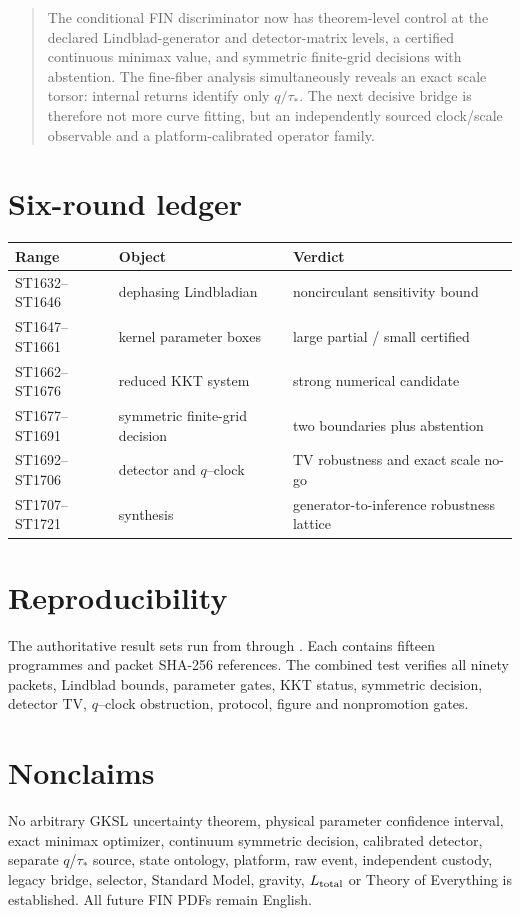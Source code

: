 \documentclass[11pt,a4paper]{article}
\begin{document}
\begin{quote}
The conditional FIN discriminator now has theorem-level control at the
declared Lindblad-generator and detector-matrix levels, a certified continuous
minimax value, and symmetric finite-grid decisions with abstention.  The
fine-fiber analysis simultaneously reveals an exact scale torsor: internal
returns identify only $q/\tau_*$.  The next decisive bridge is therefore not
more curve fitting, but an independently sourced clock/scale observable and a
platform-calibrated operator family.
\end{quote}

\appendix
\section{Six-round ledger}
\begin{longtable}{@{}p{}p{}p{}@{}}
\toprule
Range & Object & Verdict \\
\midrule\endhead
ST1632--ST1646 & dephasing Lindbladian & noncirculant sensitivity bound \\
ST1647--ST1661 & kernel parameter boxes & large partial / small certified \\
ST1662--ST1676 & reduced KKT system & strong numerical candidate \\
ST1677--ST1691 & symmetric finite-grid decision & two boundaries plus abstention \\
ST1692--ST1706 & detector and $q$--clock & TV robustness and exact scale no-go \\
ST1707--ST1721 & synthesis & generator-to-inference robustness lattice \\
\bottomrule
\end{longtable}

\section{Reproducibility}
The authoritative result sets run from
 through
.  Each contains fifteen programmes and
packet SHA-256 references.  The combined test
 verifies all ninety packets, Lindblad bounds,
parameter gates, KKT status, symmetric decision, detector TV, $q$--clock
obstruction, protocol, figure and nonpromotion gates.

\section{Nonclaims}
No arbitrary GKSL uncertainty theorem, physical parameter confidence interval,
exact minimax optimizer, continuum symmetric decision, calibrated detector,
separate $q$/$\tau_*$ source, state ontology, platform, raw event, independent
custody, legacy bridge, selector, Standard Model, gravity, $L_{\rm total}$ or
Theory of Everything is established.  All future FIN PDFs remain English.
\end{document}
